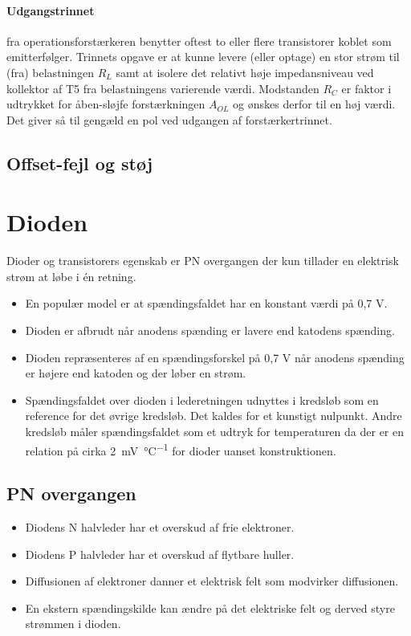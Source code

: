 \documentclass[danish]{article}
\begin{document}
\paragraph{Udgangstrinnet} fra operationsforstærkeren benytter oftest to eller flere transistorer koblet som emitterfølger. Trinnets opgave er at kunne levere (eller optage) en stor strøm til (fra) belastningen $R_L$ samt at isolere det relativt høje impedansniveau ved kollektor af T5 fra belastningens varierende værdi. Modstanden $R_C$ er faktor i udtrykket for åben-sløjfe forstærkningen $A_{OL}$ og ønskes derfor til en høj værdi. Det giver så til gengæld en pol ved udgangen af forstærkertrinnet.

\subsection{Offset-fejl og støj}

\newpage
\section{Dioden}
Dioder og transistorers egenskab er PN overgangen der kun tillader en elektrisk strøm at løbe i én retning.

\begin{itemize}
	\item En populær model er at spændingsfaldet har en konstant værdi på 0,7 V.
	\item Dioden er afbrudt når anodens spænding er lavere end katodens spænding.
	\item Dioden repræsenteres af en spændingsforskel på 0,7 V når anodens spænding er højere end katoden og der løber en strøm.
	\item Spændingsfaldet over dioden i lederetningen udnyttes i kredsløb som en reference for det øvrige kredsløb. Det kaldes for et kunstigt nulpunkt.
	Andre kredsløb måler spændingsfaldet som et udtryk for temperaturen da der er en relation på cirka \SI{2}{\milli\volt\per\degreeCelsius} for dioder uanset konstruktionen.
\end{itemize}


\subsection{PN overgangen}
\begin{itemize}
	\item Diodens N halvleder har et overskud af frie elektroner.
	\item Diodens P halvleder har et overskud af flytbare huller. 
	\item Diffusionen af elektroner danner et elektrisk felt som modvirker diffusionen. 
	\item En ekstern spændingskilde kan ændre på det elektriske felt og derved styre strømmen i dioden.
\end{itemize}
\end{document}
